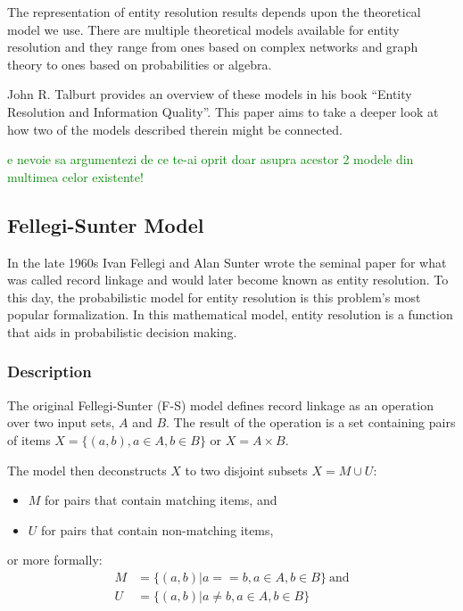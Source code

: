 \documentclass[journal]{IEEEtran}
\begin{document}
    The representation of entity resolution results depends upon the theoretical
    model we use.
    There are multiple theoretical models available for entity resolution and
    they range from ones based on complex networks and graph theory\cite{Li2020}
    to ones based on probabilities\cite{fs1969} or
    algebra\cite{Tal11,Ben2009Swoosh}.

    John R. Talburt provides an overview of these models in his book ``Entity
    Resolution and Information Quality''\cite{Tal11}.
    This paper aims to take a deeper look at how two of the models described
    therein might be connected.

    \textcolor{green}{e nevoie sa argumentezi de ce te-ai oprit doar asupra acestor 2 modele din multimea celor existente!}

    \subsection[fsm]{Fellegi-Sunter Model}\label{subsec:fsm}

    In the late 1960s Ivan Fellegi and Alan Sunter wrote the seminal
    paper\cite{fs1969} for what was called record linkage and would later become
    known as entity resolution.
    To this day, the probabilistic model for entity resolution is this problem's
    most popular formalization.
    In this mathematical model, entity resolution is a function that aids in 
    probabilistic decision making.
    
    \subsubsection[fsm-desc]{Description}\label{subsubsec:fsm-desc}

    The original Fellegi-Sunter (F-S) model defines record linkage as an operation over two input
    sets, $A$ and $B$.
    The result of the operation is a set containing pairs of items
    $X = \{(a, b), a \in A, b \in B\}$ or $X = A \times B$.
    
    The model then deconstructs $X$ to two disjoint subsets $X = M \cup U$:
    \begin{itemize}
        \item $M$ for pairs that contain matching items, and
        \item $U$ for pairs that contain non-matching items,
    \end{itemize}
    or more formally:
    \begin{align}
        M &= \{(a, b) | a == b, a \in A, b \in B\}~\textrm{and}\nonumber \\
        U &= \{(a, b) | a \neq b, a \in A, b \in B\}\nonumber
    \end{align}
\end{document}
